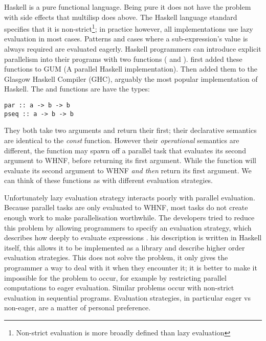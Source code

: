 Haskell is a pure functional language.
Being pure it does not have the problem with side effects that multilisp
does above.
The Haskell language standard specifies that it is non-strict\footnote{
    Non-strict evaluation is more broadly defined than lazy evaluation};
in practice however, all implementations use lazy evaluation in most cases.
Patterns and cases where a sub-expression's value is always required are
evaluated eagerly.
Haskell programmers can introduce explicit parallelism into their programs
with two functions ( and ).
\citet{gph:gum,loidi:2008:gph-significant-parallelism} first added
these functions to GUM (A parallel Haskell implementation).
Then \citet{harris:2005:haskell-smp} added them to the
Glasgow Haskell Compiler (GHC),
arguably the most popular implementation of Haskell.
The  and  functions are have the types:

\begin{verbatim}
par :: a -> b -> b
pseq :: a -> b -> b
\end{verbatim}
They both take two arguments and return their first;
their declarative semantics are identical to the \emph{const} function.
However their \emph{operational} semantics are different,
the  function may spawn off a parallel task that evaluates its
second argument to WHNF,
before returning its first argument.
While the  function will evaluate its second argument to WHNF
\emph{and then} return its first argument.
We can think of these functions as  with different evaluation
strategies.

Unfortunately lazy evaluation strategy interacts poorly with
parallel evaluation.
Because parallel tasks are only evaluated to WHNF,
most tasks do not create enough work to make parallelisation worthwhile.
The developers tried to reduce this problem by allowing programmers to
specify an evaluation strategy,
which describes how deeply to evaluate expressions \citep{trinder:98:strategies}.
his description is written in Haskell itself,
this allows it to be implemented as a library and describe higher order
evaluation strategies.
This does not solve the problem,
it only gives the programmer a way to deal with it when they encounter it;
it is better to make it impossible for the problem to occur,
for example by restricting parallel computations to eager evaluation.
Similar problems occur with non-strict evaluation in sequential programs.
Evaluation strategies, in particular eager vs non-eager,
are a matter of personal preference.

